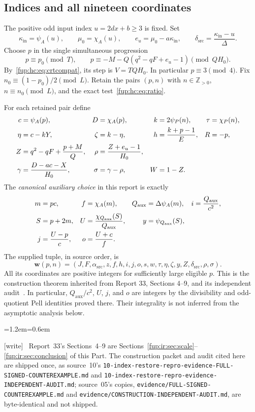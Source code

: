 \documentclass[11pt,letterpaper]{article}
\theoremstyle{definition}\newtheorem{definition}[theorem]{Definition}
\theoremstyle{remark}\newtheorem{remark}[theorem]{Remark}
\newcommand{\pos}{\mathbb Z_{>0}}
\newcommand{\qaux}{Q_{\mathrm{aux}}}
\newcommand{\asrc}{\alpha_{\mathrm{src}}}
\newcommand{\dsrc}{\delta_{\mathrm{src}}}
\newcommand{\kin}{\kappa_{\mathrm{in}}}
\newcommand{\wtag}{\textup{[write]}}
\newenvironment{writenote}{\par\smallskip\begin{list}{}{\leftmargin=1.2em\rightmargin=0.6em}\item[]\small\wtag\ }{\end{list}\smallskip}
\newcommand{\rw}[1]{\nolinkurl{#1}}%
\begin{document}
\subsection{Indices and all nineteen coordinates}
The positive odd input index $u=2dx+b\ge3$ is fixed. Set
\begin{equation}\label{fup:hc:eq:inputfixed}
 \kin=\psi_A(u),\qquad \mu_0=\chi_A(u),\qquad
 e_u=\mu_0-a\kin,\qquad \dsrc=\frac{\kin-u}{\Delta}.
\end{equation}
Choose $p$ in the single simultaneous progression
\begin{equation}\label{fup:hc:eq:crt}
 p\equiv p_0\pmod T,\qquad
 p\equiv-M-Q(q^2-qF+e_u-1)\pmod{QH_0}.
\end{equation}
By~\eqref{fup:hc:eq:crtcompat}, its step is $V=TQH_0$. In particular $p\equiv3\pmod4$. Fix $n_0\equiv(1-p_0)/2\pmod L$. Retain the pairs $(p,n)$ with $n\in\pos$, $n\equiv n_0\pmod L$, and the exact test~\eqref{fup:hc:eq:ratio}.

For each retained pair define
\begin{align}\label{fup:hc:eq:maincoords}
 c&=\psi_A(p),&D&=\chi_A(p),&k&=2\psi_P(n),&\tau&=\chi_P(n),\notag\\
 \eta&=c-kY,&\zeta&=k-\eta,&h&=\frac{k+p-1}{E},&R&=-p,\\
 Z&=q^2-qF+\frac{p+M}{Q},&\rho&=\frac{Z+e_u-1}{H_0},&&&\notag\\
 \gamma&=\frac{D-ac-X}{H_0},&\sigma&=\gamma-\rho,&W&=1-Z.&&\notag
\end{align}
The \emph{canonical auxiliary choice} in this report is exactly
\begin{align}\label{fup:hc:eq:auxcoords}
 m&=pc,&f&=\chi_A(m),&\qaux&=\Delta\psi_A(m),&i&=\frac{\qaux}{c^2},\notag\\
 S&=p+2m,&U&=\frac{\chi_{\qaux}(S)}{\qaux},&y&=\psi_{\qaux}(S),&&\\
 j&=\frac{U-p}{c},&o&=\frac{U+c}{f}.&&&&\notag
\end{align}
The supplied tuple, in source order, is
\begin{equation}\label{fup:hc:eq:tuple}
 \mathbf w(p,n)=(J,F,\asrc,z,f,h,i,j,o,s,w,\tau,\eta,\zeta,y,Z,\dsrc,\rho,\sigma).
\end{equation}
All its coordinates are positive integers for sufficiently large eligible $p$. This is the construction theorem inherited from Report 33, Sections 4--9, and its independent audit~\cite{fup:hc:construction,fup:hc:audit33}. In particular, $\qaux/c^2$, $U$, $j$, and $o$ are integers by the divisibility and odd-quotient Pell identities proved there. Their integrality is not inferred from the asymptotic analysis below.
\begin{writenote}
Report~33's Sections~4--9 are Sections~\ref{fup:ir:sec:scale}--\ref{fup:ir:sec:conclusion} of this Part. The construction packet and audit cited here are shipped once, as source~10's \rw{10-index-restore-repro-evidence-FULL-SIGNED-COUNTEREXAMPLE.md} and \rw{10-index-restore-repro-evidence-INDEPENDENT-AUDIT.md}; source~05's copies, \rw{evidence/FULL-SIGNED-COUNTEREXAMPLE.md} and \rw{evidence/CONSTRUCTION-INDEPENDENT-AUDIT.md}, are byte-identical and not shipped.
\end{writenote}
\end{document}
